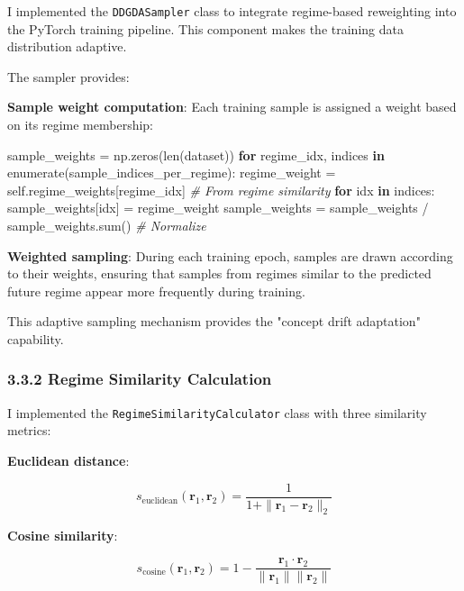\documentclass[
]{article}
\newenvironment{Shaded}{}{}
\newcommand{\BuiltInTok}[1]{\textcolor[rgb]{0.00,0.50,0.00}{#1}}
\newcommand{\CommentTok}[1]{\textcolor[rgb]{0.38,0.63,0.69}{\textit{#1}}}
\newcommand{\ControlFlowTok}[1]{\textcolor[rgb]{0.00,0.44,0.13}{\textbf{#1}}}
\newcommand{\KeywordTok}[1]{\textcolor[rgb]{0.00,0.44,0.13}{\textbf{#1}}}
\newcommand{\NormalTok}[1]{#1}
\newcommand{\OperatorTok}[1]{\textcolor[rgb]{0.40,0.40,0.40}{#1}}
\newcommand{\VariableTok}[1]{\textcolor[rgb]{0.10,0.09,0.49}{#1}}
\begin{document}
I implemented the \texttt{DDGDASampler} class to integrate regime-based
reweighting into the PyTorch training pipeline. This component makes the
training data distribution adaptive.

The sampler provides:

\textbf{Sample weight computation}: Each training sample is assigned a
weight based on its regime membership:

\begin{Shaded}
\begin{Highlighting}[]
\NormalTok{sample\_weights }\OperatorTok{=}\NormalTok{ np.zeros(}\BuiltInTok{len}\NormalTok{(dataset))}
\ControlFlowTok{for}\NormalTok{ regime\_idx, indices }\KeywordTok{in} \BuiltInTok{enumerate}\NormalTok{(sample\_indices\_per\_regime):}
\NormalTok{    regime\_weight }\OperatorTok{=} \VariableTok{self}\NormalTok{.regime\_weights[regime\_idx]  }\CommentTok{\# From regime similarity}
    \ControlFlowTok{for}\NormalTok{ idx }\KeywordTok{in}\NormalTok{ indices:}
\NormalTok{        sample\_weights[idx] }\OperatorTok{=}\NormalTok{ regime\_weight}
\NormalTok{sample\_weights }\OperatorTok{=}\NormalTok{ sample\_weights }\OperatorTok{/}\NormalTok{ sample\_weights.}\BuiltInTok{sum}\NormalTok{()  }\CommentTok{\# Normalize}
\end{Highlighting}
\end{Shaded}

\textbf{Weighted sampling}: During each training epoch, samples are
drawn according to their weights, ensuring that samples from regimes
similar to the predicted future regime appear more frequently during
training.

This adaptive sampling mechanism provides the "concept drift adaptation"
capability.

\subsubsection{3.3.2 Regime Similarity
Calculation}\label{332-regime-similarity-calculation}

I implemented the \texttt{RegimeSimilarityCalculator} class with three
similarity metrics:

\textbf{Euclidean distance}:

\[s_{\text{euclidean}}(\mathbf{r}_1, \mathbf{r}_2) = \frac{1}{1 + \|\mathbf{r}_1 - \mathbf{r}_2\|_2}\]

\textbf{Cosine similarity}:

\[s_{\text{cosine}}(\mathbf{r}_1, \mathbf{r}_2) = 1 - \frac{\mathbf{r}_1 \cdot \mathbf{r}_2}{\|\mathbf{r}_1\| \|\mathbf{r}_2\|}\]
\end{document}
